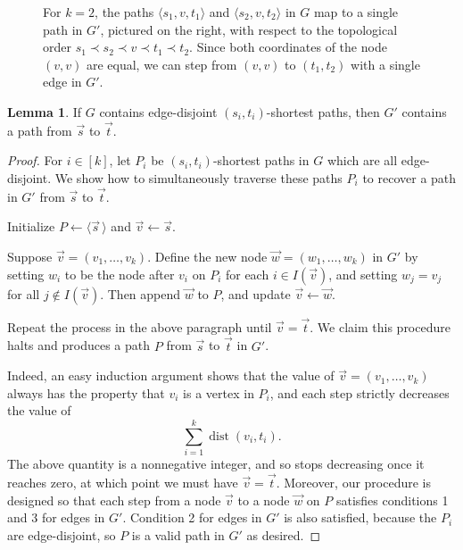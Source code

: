 \documentclass[11pt]{article}
\newcommand{\pair}[1]{\langle #1\rangle}
\DeclareMathOperator{\dist}{dist}
\theoremstyle{definition}
\newtheorem{lemma}[theorem]{Lemma}
\begin{document}
\begin{figure}[t]
    \caption{For $k=2$, the paths $\pair{s_1, v, t_1}$ and $\pair{s_2, v, t_2}$ in $G$ map to a single path in $G'$, pictured on the right, with respect to the topological order $s_1 \prec s_2 \prec v \prec t_1 \prec t_2$.
    Since both coordinates of the node $(v,v)$ are equal, we can step from $(v,v)$ to $(t_1, t_2)$ with a single edge in $G'$.} 
    \label{fig:k-EDSP}
\end{figure}

    \begin{lemma}
        \label{metagraph-EDP-to-path}
        If $G$ contains edge-disjoint $(s_i,t_i)$-shortest paths, then $G'$ contains a path from $\vec{s}$ to $\vec{t}$.
    \end{lemma}
    \begin{proof}
        For $i\in [k]$, let $P_i$  be $(s_i,t_i)$-shortest paths in $G$ which are all edge-disjoint.
        We show how to simultaneously traverse these paths $P_i$ to recover a path in $G'$ from $\vec{s}$ to $\vec{t}$.

                Initialize $P \leftarrow \langle \vec{s}\,\rangle$ and  $\vec{v} \leftarrow \vec{s}$.

        Suppose $\vec{v} = (v_1, \dots, v_k)$.
        Define the new node $\vec{w} = (w_1, \dots, w_k)$ in $G'$ by setting $w_i$ to be the node after $v_i$ on $P_i$ for each $i\in I(\vec{v})$, and setting $w_j = v_j$ for all $j\not\in I(\vec{v})$.
        Then append $\vec{w}$ to $P$, and update $\vec{v} \leftarrow \vec{w}$.

        Repeat the process in the above paragraph until $\vec{v} = \vec{t}$.
        We claim this procedure halts and produces a path $P$ from $\vec{s}$ to $\vec{t}$ in $G'$.

        Indeed, an easy induction argument shows that the value of $\vec{v} = (v_1, \dots, v_k)$ always has the property that $v_i$ is a vertex in $P_i$, and each step strictly decreases the value of 
            \[\sum_{i=1}^k \dist(v_i,t_i).\]
        The above quantity is a nonnegative integer, and so stops decreasing once it reaches zero, at which point we must have $\vec{v} = \vec{t}$.
        Moreover, our procedure is designed so that each step from a node $\vec{v}$ to a node $\vec{w}$ on $P$ satisfies conditions 1 and 3 for edges in $G'$.
        Condition 2 for edges in $G'$ is also satisfied, because the $P_i$ are edge-disjoint, so $P$ is a valid path in $G'$ as desired.
    \end{proof}
    
\end{document}
